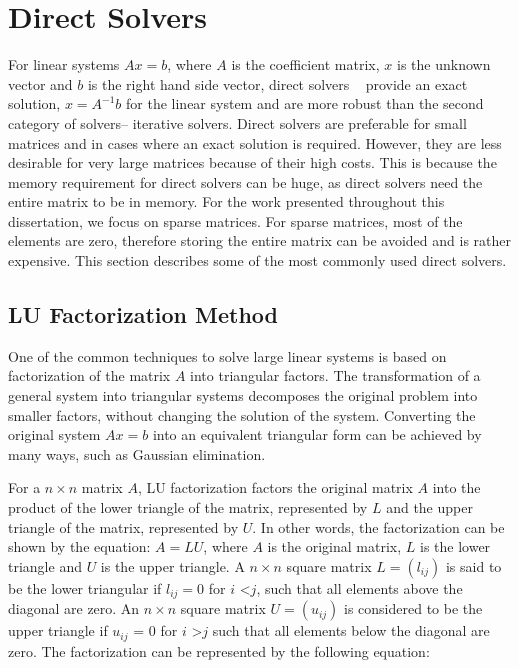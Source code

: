 \section{Direct Solvers} \label{DirectSolvers}
For linear systems $Ax=b$, where $A$ is the coefficient matrix, $x$ is the unknown vector and $b$ is the right hand side vector, direct solvers ~\cite{direct1, direct2} provide an exact solution, $x = A^{-1}b$ for the linear system and are more robust than the second category of solvers-- iterative solvers. Direct solvers are preferable for small matrices and in cases where an exact solution is required. However, they are less desirable for very large matrices because of their high costs. This is because the memory requirement for direct solvers can be huge, as direct solvers need the entire matrix to be in memory. For the work presented throughout this dissertation, we focus on sparse matrices. For sparse matrices, most of the elements are zero, therefore storing the entire matrix can be avoided and is rather expensive. This section describes some of the most commonly used direct solvers.


\subsection{LU Factorization Method}
One of the common techniques to solve large linear systems is based on factorization of the matrix $A$ into triangular factors. The transformation of a general system into triangular systems decomposes the original problem into smaller factors, without changing the solution of the system. Converting the original system $Ax = b$ into an equivalent triangular form can be achieved by many ways, such as Gaussian elimination.

For a $n \times n$ matrix $A$, LU factorization factors the original matrix $A$ into the product of the lower triangle of the matrix, represented by $L$ and the upper triangle of the matrix, represented by $U$. In other words, the factorization can be shown by the equation: $A = LU$, where $A$ is the original matrix, $L$ is the lower triangle and $U$ is the upper triangle. A $n \times n$ square matrix $L=(l_{ij})$ is said to be the lower triangular if $l_{ij} = 0$ for $i$ \textless $j$, such that all elements above the diagonal are zero. An $n \times n$ square matrix $U = (u_{ij})$ is considered to be the upper triangle if $u_{ij}$ = 0 for $i$ \textgreater $j$ such that all elements below the diagonal are zero. The factorization can be represented by the following equation: 


